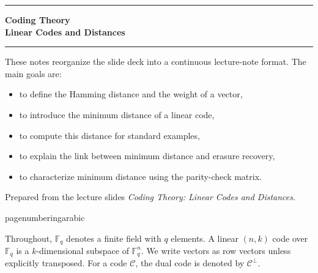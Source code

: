 \documentclass[11pt]{article}
\theoremstyle{definition}
\theoremstyle{remark}
\newcommand{\F}{\mathbb{F}}
\newcommand{\code}{\mathcal{C}}
\newcommand{\dual}[1]{#1^{\perp}}
\begin{document}

\begin{titlepage}
\centering
\vspace*{2cm}

{\color{accent}\rule{0.82\textwidth}{1.2pt}}\par
\vspace{0.8cm}
{
  \Huge\bfseries Coding Theory\\[0.35em]
  \LARGE Linear Codes and Distances
}\par
\vspace{0.8cm}
{\color{accent}\rule{0.82\textwidth}{1.2pt}}\par
\vspace{1.2cm}

\begin{tcolorbox}[
  width=0.86\textwidth,
  colback=softaccent,
  colframe=accent!65,
  boxrule=0.8pt,
  arc=2mm,
  left=8pt,right=8pt,top=8pt,bottom=8pt
]
\large
These notes reorganize the slide deck into a continuous lecture-note format. The main goals are:
\begin{itemize}[leftmargin=1.4em,itemsep=0.35em,topsep=0.35em]
    \item to define the Hamming distance and the weight of a vector,
    \item to introduce the minimum distance of a linear code,
    \item to compute this distance for standard examples,
    \item to explain the link between minimum distance and erasure recovery,
    \item to characterize minimum distance using the parity-check matrix.
\end{itemize}
\end{tcolorbox}

\vfill
{\normalsize Prepared from the lecture slides \emph{Coding Theory: Linear Codes and Distances}.}

\end{titlepage}

pagenumbering{arabic}
\setcounter{page}{1}

\tableofcontents
\vspace{0.8em}

\begin{tcolorbox}[
  colback=softgray,
  colframe=rulegray,
  boxrule=0.6pt,
  arc=1.5mm,
  left=8pt,right=8pt,top=6pt,bottom=6pt,
  title=Notation,
  coltitle=black,
  fonttitle=\bfseries
]
Throughout, $\F_q$ denotes a finite field with $q$ elements. A linear $(n,k)$ code over $\F_q$ is a $k$-dimensional subspace of $\F_q^n$. We write vectors as row vectors unless explicitly transposed. For a code $\code$, the dual code is denoted by $\dual{\code}$.
\end{tcolorbox}
\end{document}
